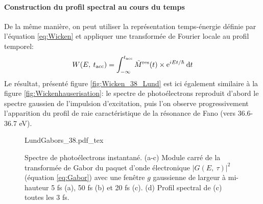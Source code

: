 \paragraph*{Construction du profil spectral au cours du temps} De la même manière, on peut utiliser la représentation temps-énergie définie par l'équation \ref{eq:Wicken} et appliquer une transformée de Fourier locale au profil temporel:
\begin{equation}
W(E, \: t_{\text{acc}}) = \int_{- \infty}^{t_{\text{acc}}} \tilde{M}^{\text{res}}(t) \times \mathrm{e}^{i E t / \hbar} \: \mathrm{d} t
\end{equation}
Le résultat, présenté figure \ref{fig:Wicken_38_Lund} est ici également similaire à la figure \ref{fig:Wickenhauserisation}: le spectre de photoélectrons reproduit d'abord le spectre gaussien de l'impulsion d'excitation, puis l'on observe progressivement l'apparition du profil de raie caractéristique de la résonance de Fano (vers 36.6-36.7 eV).

\begin{figure}[h]
\centering
\def\svgwidth{\textwidth}
{LundGabors_38.pdf_tex}
\caption{Spectre de photoélectrons instantané. (a-c) Module carré de la transformée de Gabor du paquet d'onde électronique $|G(E, \: \tau)|^2$(équation \ref{eq:Gabor}) avec une fenêtre $g$ gaussienne de largeur à mi-hauteur 5 fs (a), 50 fs (b) et 20 fs (c). (d) Profil spectral de (c) toutes les 3 fs.}
\label{fig:LundGabors_38}
\end{figure}

